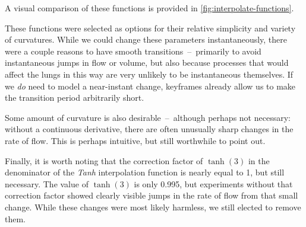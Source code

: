 \noindent
A visual comparison of these functions is provided in \autoref{fig:interpolate-functions}.

These functions were selected as options for their relative simplicity and variety of curvatures.
While we could change these parameters instantaneously, there were a couple reasons to have smooth
transitions~--~primarily to avoid instantaneous jumps in flow or volume, but also because processes
that would affect the lungs in this way are very unlikely to be instantaneous themselves. If we
\textit{do} need to model a near-instant change, keyframes already allow us to make the transition
period arbitrarily short.

Some amount of curvature is also desirable~--~although perhaps not necessary: without a continuous
derivative, there are often unusually sharp changes in the rate of flow. This is perhaps intuitive,
but still worthwhile to point out.

Finally, it is worth noting that the correction factor of $\tanh(3)$ in the denominator of the
\textit{Tanh} interpolation function is nearly equal to 1, but still necessary. The value of
$\tanh(3)$ is only 0.995, but experiments without that correction factor showed clearly visible
jumps in the rate of flow from that small change. While these changes were most likely harmless, we
still elected to remove them.
